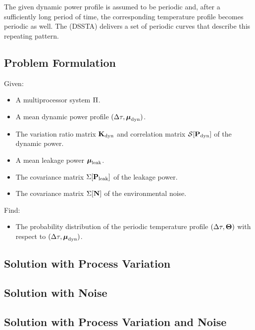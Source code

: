 The given dynamic power profile is assumed to be periodic and, after a sufficiently long period of time, the corresponding temperature profile becomes periodic as well. The  (DSSTA) delivers a set of periodic curves that describe this repeating pattern.

\subsection{Problem Formulation}
Given:
\begin{itemize}
  \item A multiprocessor system $\Pi$.
  \item A mean dynamic power profile $(\Delta \tau, \boldsymbol\mu_{\text{dyn}})$.
  \item The variation ratio matrix $\mathbf{K}_{\text{dyn}}$ and correlation matrix $\mathcal{S}[{\mathbf{P}_{\text{dyn}}}]$ of the dynamic power.
  \item A mean leakage power $\boldsymbol\mu_{\text{leak}}$.
  \item The covariance matrix $\Sigma[\mathbf{P}_{\text{leak}}]$ of the leakage power.
  \item The covariance matrix $\Sigma[\mathbf{N}]$ of the environmental noise.
\end{itemize}

Find:
\begin{itemize}
  \item The probability distribution of the periodic temperature profile $(\Delta \tau, \mathbf{\Theta})$ with respect to $(\Delta \tau, \boldsymbol\mu_{\text{dyn}})$.
\end{itemize}

\subsection{Solution with Process Variation} 


\subsection{Solution with Noise} 


\subsection{Solution with Process Variation and Noise} 

